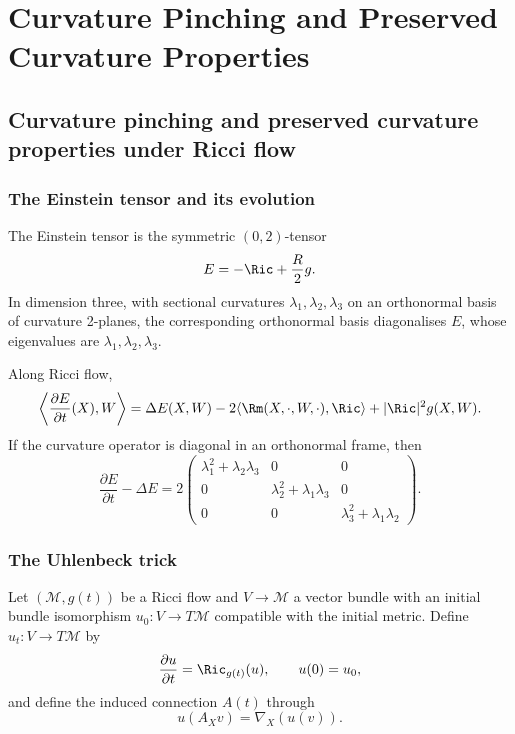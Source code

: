 \chapter{Curvature Pinching and Preserved Curvature Properties}

\section{Curvature pinching and preserved curvature properties under Ricci flow}

\subsection{The Einstein tensor and its evolution}

\begin{definition}
\label{topping-ch9-einstein-tensor}
The Einstein tensor is the symmetric \((0,2)\)-tensor
\[
E=-\Ric+\frac{R}{2}g.
\]
In dimension three, with sectional curvatures
\(\lambda_1,\lambda_2,\lambda_3\) on an orthonormal basis of curvature
2-planes, the corresponding orthonormal basis diagonalises \(E\), whose
eigenvalues are \(\lambda_1,\lambda_2,\lambda_3\).
\end{definition}

\begin{proposition}
\label{topping-ch9-einstein-evolution}

Along Ricci flow,
\[
\left\langle \frac{\partial E}{\partial t}(X),W\right\rangle
=\Delta E(X,W)-2\langle \Rm(X,\cdot,W,\cdot),\Ric\rangle
+|\Ric|^2g(X,W).
\]
If the curvature operator is diagonal in an orthonormal frame, then
\[
\frac{\partial E}{\partial t}-\Delta E
=2\begin{pmatrix}
\lambda_1^2+\lambda_2\lambda_3 & 0 & 0\\
0 & \lambda_2^2+\lambda_1\lambda_3 & 0\\
0 & 0 & \lambda_3^2+\lambda_1\lambda_2
\end{pmatrix}.
\]
\end{proposition}

\subsection{The Uhlenbeck trick}

\begin{definition}
\label{topping-ch9-uhlenbeck-setup}
Let \((\mathcal M,g(t))\) be a Ricci flow and \(V\to\mathcal M\) a vector
bundle with an initial bundle isomorphism \(u_0:V\to T\mathcal M\) compatible
with the initial metric. Define \(u_t:V\to T\mathcal M\) by
\[
\frac{\partial u}{\partial t}=\Ric_{g(t)}(u),\qquad u(0)=u_0,
\]
and define the induced connection \(A(t)\) through
\[
u(A_Xv)=\nabla_X(u(v)).
\]
\end{definition}

